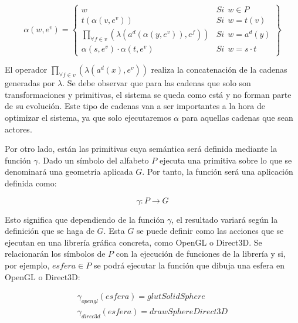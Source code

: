 \documentclass{egpubl}
\begin{document}
\begin{equation}
	\alpha (w,e^{v}) = \left\{
	\begin{array}{cl}
		w 	& \mathit{Si} \ \ w \in P  \\

		t(\alpha (v,e^{v})) 	& \mathit{Si}  \ \  w = t(v)  \\

		\underset{\forall f \in v}{ \prod }(\lambda (a^{d}(\alpha
			(y,e^{v})),e^{f})) 	& \mathit{Si}  \ \ w = a^{d}(y)  \\

		\alpha (s,e^{v}) \cdot \alpha (t,e^{v}) 	& \mathit{Si}  \ \  w = s \cdot t 
	\end{array}\right\}
\end{equation}


El operador $\underset{\forall f \in v}{\prod }(\lambda (a^{d}(x),e^{v}))$ 
realiza la concatenaci\'on de la cadenas generadas por
$\lambda$. Se debe observar que para las cadenas que
solo son transformaciones y primitivas,
el sistema se queda como est\'a y no
forman parte de su evoluci\'on. Este tipo de cadenas van a ser
importantes a la hora de optimizar el
sistema, ya que solo ejecutaremos
$\alpha$ para aquellas cadenas que sean actores.

Por otro lado, est\'an las primitivas cuya sem\'antica ser\'a definida
mediante la funci\'on $\gamma$. Dado un s\'imbolo del alfabeto $P$
ejecuta una primitiva sobre lo que se denominar\'a una geometr\'ia
aplicada $G$. Por tanto, la funci\'on ser\'a una aplicaci\'on definida
como:

\begin{equation}
	\gamma: P \rightarrow G	
\end{equation}



Esto significa que dependiendo de la funci\'on ${\gamma}$, el resultado
variar\'a seg\'un la definici\'on que se haga de $G$. Esta $G$ se puede
definir como las acciones que se ejecutan en una librer\'ia gr\'afica
concreta, como OpenGL o Direct3D. Se relacionar\'an los s\'imbolos de $P$
con la ejecuci\'on de funciones de la librer\'ia y si, por ejemplo,
$esfera \in P$ se podr\'a ejecutar la funci\'on que dibuja
una esfera en OpenGL o Direct3D:


\[ \begin{matrix}
	\gamma_{opengl}(esfera) = glutSolidSphere \\
	\gamma_{direc3d}(esfera) = drawSphereDirect3D
\end{matrix} \]
\end{document}
